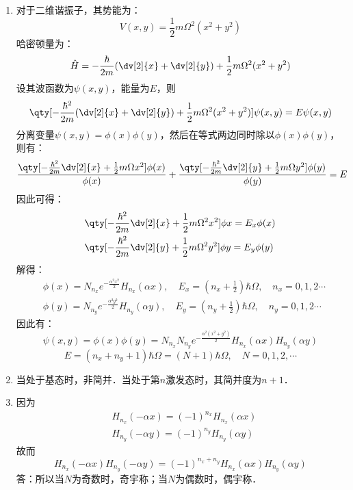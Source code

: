 \begin{enumerate}
\item 对于二维谐振子，其势能为：
\begin{equation}
V(x,y)=\frac{1}{2}m\Omega^{2}(x^{2}+y^{2})
\end{equation}
哈密顿量为：
\begin{equation}
\hat{H}=-\frac{\hbar}{2m}(\dv[2]{x}+\dv[2]{y})+\frac{1}{2}m\Omega^{2}(x^{2}+y^{2})
\end{equation}
设其波函数为$\psi(x,y)$，能量为$E$，则
\begin{equation}
\qty[ -\frac{\hbar^{2}}{2m}(\dv[2]{x} + \dv[2]{y})+\frac{1}{2}m\Omega^{2}(x^{2}+y^{2})]\psi(x,y)=E\psi(x,y)
\end{equation}
分离变量$\psi(x,y)=\phi(x)\phi(y)$，然后在等式两边同时除以$\phi(x)\phi(y)$，则有：
\begin{equation}
\frac{\qty[-\frac{\hbar^{2}}{2m}\dv[2]{x}+\frac{1}{2}m\Omega x^{2}]\phi(x)}{\phi(x)}+\frac{\qty[-\frac{\hbar^{2}}{2m}\dv[2]{y}+\frac{1}{2}m\Omega y^{2}]\phi(y)}{\phi(y)}=E
\end{equation}
因此可得：
\begin{align}
&\qty[-\frac{\hbar^{2}}{2m}\dv[2]{x}+\frac{1}{2}m\Omega^{2}x^{2}]\phi{x}=E_{x}\phi(x)\\
&\qty[-\frac{\hbar^{2}}{2m}\dv[2]{y}+\frac{1}{2}m\Omega^{2}y^{2}]\phi{y}=E_{y}\phi(y)
\end{align}
解得：
\begin{align}
&\phi(x)=N_{n_{x}}e^{-\frac{\alpha^{2}x^{2}}{2}}H_{n_{x}}(\alpha x),\quad E_{x}=(n_{x}+\frac{1}{2})\hbar \Omega,\quad n_{x}=0,1,2\cdots \\
&\phi(y)=N_{n_{y}}e^{-\frac{\alpha^{2}y^{2}}{2}}H_{n_{y}}(\alpha y),\quad E_{y}=(n_{y}+\frac{1}{2})\hbar \Omega,\quad n_{y}=0,1,2\cdots
\end{align}
因此有：
\begin{equation}
\psi(x,y)=\phi(x)\phi(y)=N_{n_{x}}N_{n_{y}}e^{-\frac{\alpha^{2}(x^{2}+y^{2})}{2}}H_{n_{x}}(\alpha x)H_{n_{y}}(\alpha y)
\end{equation}
\begin{equation}
E=(n_{x}+n_{y}+1)\hbar \Omega=(N+1)\hbar \Omega,\quad N=0,1,2,\cdots
\end{equation}
\item 当处于基态时，非简并．当处于第$n$激发态时，其简并度为$n+1$．
\item 因为
\begin{align}
&H_{n_x}(-\alpha x)=(-1)^{n_x}H_{n_x}(\alpha x) \\
&H_{n_y}(-\alpha y)=(-1)^{n_y}H_{n_y}(\alpha y)
\end{align}
故而
\begin{equation}
H_{n_x}(-\alpha x)H_{n_y}(-\alpha y)=(-1)^{n_x + n_y}H_{n_x}(\alpha x)H_{n_y}(\alpha y)
\end{equation}
答：所以当$N$为奇数时，奇宇称；当$N$为偶数时，偶宇称．
\end{enumerate}
